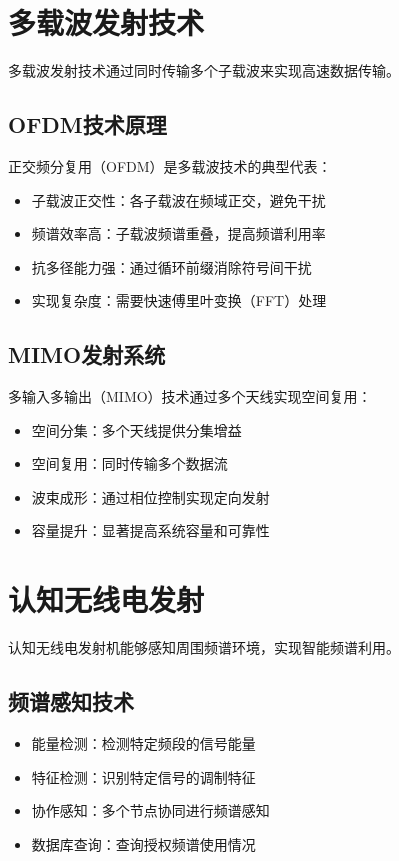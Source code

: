 \documentclass[12pt,UTF8]{ctexbook}
\begin{document}
\section{多载波发射技术}

多载波发射技术通过同时传输多个子载波来实现高速数据传输。

\subsection{OFDM技术原理}
正交频分复用（OFDM）是多载波技术的典型代表：
\begin{itemize}[leftmargin=3.5em]
    \item 子载波正交性：各子载波在频域正交，避免干扰
    \item 频谱效率高：子载波频谱重叠，提高频谱利用率
    \item 抗多径能力强：通过循环前缀消除符号间干扰
    \item 实现复杂度：需要快速傅里叶变换（FFT）处理
\end{itemize}

\subsection{MIMO发射系统}
多输入多输出（MIMO）技术通过多个天线实现空间复用：
\begin{itemize}[leftmargin=3.5em]
    \item 空间分集：多个天线提供分集增益
    \item 空间复用：同时传输多个数据流
    \item 波束成形：通过相位控制实现定向发射
    \item 容量提升：显著提高系统容量和可靠性
\end{itemize}

\section{认知无线电发射}

认知无线电发射机能够感知周围频谱环境，实现智能频谱利用。

\subsection{频谱感知技术}
\begin{itemize}[leftmargin=3.5em]
    \item 能量检测：检测特定频段的信号能量
    \item 特征检测：识别特定信号的调制特征
    \item 协作感知：多个节点协同进行频谱感知
    \item 数据库查询：查询授权频谱使用情况
\end{itemize}
\end{document}
